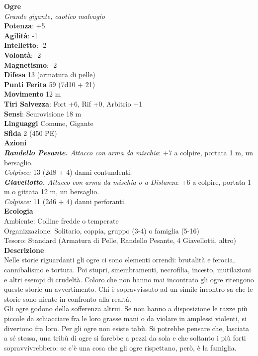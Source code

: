 \begin{multicols}{2}
\medskip\textbf{Ogre}\\
\emph{Grande gigante, caotico malvagio}\\
\textbf{Potenza}: +5\\
\textbf{Agilità}: -1\\
\textbf{Intelletto}: -2\\
\textbf{Volontà}: -2\\
\textbf{Magnetismo}: -2\\
\textbf{Difesa} 13 (armatura di pelle)\\
\textbf{Punti Ferita} 59 (7d10 + 21)\\
\textbf{Movimento} 12 m\\
\textbf{Tiri Salvezza}: Fort +6, Rif +0, Arbitrio +1\\
\textbf{Sensi}: Scurovisione 18 m\\
\textbf{Linguaggi} Comune, Gigante\\
\textbf{Sfida} 2 (450 PE)\smallskip\\
\smallskip\textbf{Azioni}\\
\emph{\textbf{Randello Pesante.} Attacco con arma da mischia}: +7 a colpire, portata 1 m, un bersaglio.\\
\emph{Colpisce:} 13 (2d8 + 4) danni contundenti.\\
\emph{\textbf{Giavellotto.} Attacco con arma da mischia o a Distanza}: +6 a colpire, portata 1 m o gittata 12 m, un bersaglio.\\
\emph{Colpisce:} 11 (2d6 + 4) danni perforanti.\\
\textbf{Ecologia}\\
Ambiente: Colline fredde o temperate\\
Organizzazione: Solitario, coppia, gruppo (3-4) o famiglia (5-16)\\
Tesoro: Standard (Armatura di Pelle, Randello Pesante, 4 Giavellotti, altro)\\
\textbf{Descrizione}\\
Nelle storie riguardanti gli ogre ci sono elementi orrendi: brutalità e ferocia, cannibalismo e tortura. Poi stupri, smembramenti, necrofilia, incesto, mutilazioni e altri esempi di crudeltà. Coloro che non hanno mai incontrato gli ogre ritengono queste storie un avvertimento. Chi è sopravvissuto ad un simile incontro sa che le storie sono niente in confronto alla realtà.\\

Gli ogre godono della sofferenza altrui. Se non hanno a disposizione le razze più piccole da schiacciare fra le loro grasse mani o da violare in amplessi violenti, si divertono fra loro. Per gli ogre non esiste tabù. Si potrebbe pensare che, lasciata a sé stessa, una tribù di ogre si farebbe a pezzi da sola e che soltanto i più forti sopravvivrebbero: se c’è una cosa che gli ogre rispettano, però, è la famiglia.\\


\end{multicols}
